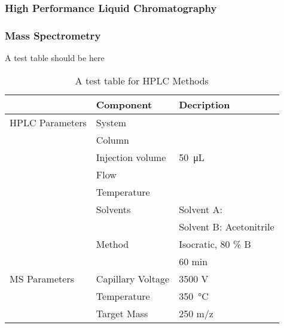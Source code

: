 \subsubsection{High Performance Liquid Chromatography} %
\label{sub:hplc}


\subsubsection{Mass Spectrometry} %
\label{sub:mass_spectrometry}

A test table should be here

\begin{table}[h]
	\caption{A test table for HPLC Methods}
	\label{tab:asddf}
	\centering
	\begin{tabularx}{\textwidth}{XXX}
						& \textbf{Component}		& \textbf{Decription}	\\
		\midrule
		HPLC Parameters & System			& 	\\
						& Column			& 	\\
						& Injection volume 	& \SI{50}{\micro\liter}	\\
						& Flow				& 	\\
						& Temperature		& 	\\
						& Solvents			& Solvent A: \ch{H2O}	\\
						& 					& Solvent B: Acetonitrile	\\
						& Method			& Isocratic, 80 \% B \\
						&					& 60 min \\
		MS Parameters	& Capillary Voltage	& 3500 V\\
						& Temperature		& \SI{350}{\celsius}	\\
						& Target Mass		& 250 m/z \\
		\bottomrule
	\end{tabularx}
\end{table}

